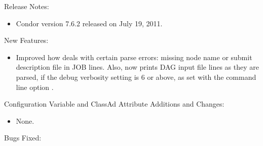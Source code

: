 \noindent Release Notes:

\begin{itemize}

\item Condor version 7.6.2 released on July 19, 2011.

\end{itemize}


\noindent New Features:

\begin{itemize}

\item Improved how  deals with certain parse errors:
missing node name or submit description file in JOB lines.
Also, 
now prints DAG input file lines as they are parsed, 
if the debug verbosity setting is 6 or above,
as set with the  command line option .

\end{itemize}

\noindent Configuration Variable and ClassAd Attribute Additions and Changes:

\begin{itemize}

\item None.

\end{itemize}

\noindent Bugs Fixed:

